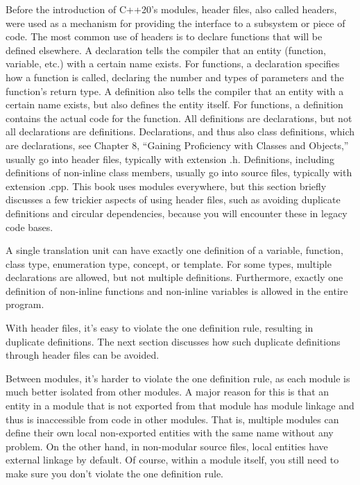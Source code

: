 
Before the introduction of C++20’s modules, header files, also called headers, were used as a mechanism for providing the interface to a subsystem or piece of code. The most common use of headers is to declare functions that will be defined elsewhere. A declaration tells the compiler that an entity (function, variable, etc.) with a certain name exists. For functions, a declaration specifies how a function is called, declaring the number and types of parameters and the function’s return type. A definition also tells the compiler that an entity with a certain name exists, but also defines the entity itself. For functions, a definition contains the actual code for the function. All definitions are declarations, but not all declarations are definitions. Declarations, and thus also class definitions, which are declarations, see Chapter 8, “Gaining Proficiency with Classes and Objects,” usually go into header files, typically with extension .h. Definitions, including definitions of non-inline class members, usually go into source files, typically with extension .cpp. This book uses modules everywhere, but this section briefly discusses a few trickier aspects of using header files, such as avoiding duplicate definitions and circular dependencies, because you will encounter these in legacy code bases.


A single translation unit can have exactly one definition of a variable, function, class type, enumeration type, concept, or template. For some types, multiple declarations are allowed, but not multiple definitions. Furthermore, exactly one definition of non-inline functions and non-inline variables is allowed in the entire program.

With header files, it’s easy to violate the one definition rule, resulting in duplicate definitions. The next section discusses how such duplicate definitions through header files can be avoided.

Between modules, it’s harder to violate the one definition rule, as each module is much better isolated from other modules. A major reason for this is that an entity in a module that is not exported from that module has module linkage and thus is inaccessible from code in other modules. That is, multiple modules can define their own local non-exported entities with the same name without any problem. On the other hand, in non-modular source files, local entities have external linkage by default. Of course, within a module itself, you still need to make sure you don’t violate the one definition rule.

